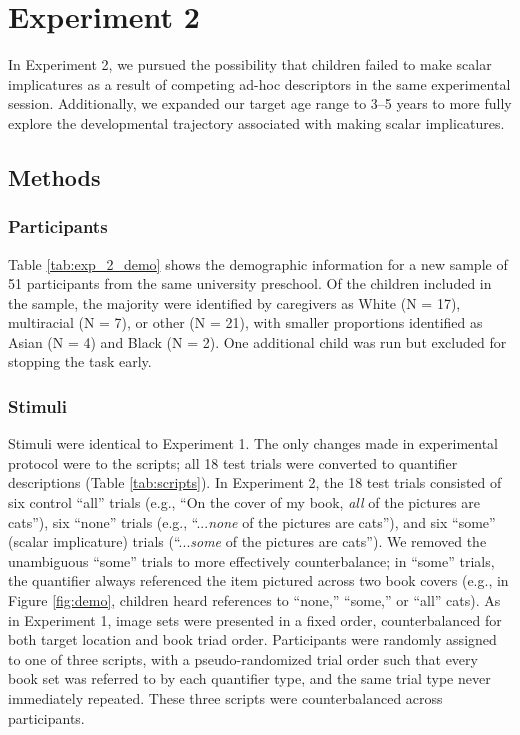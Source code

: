 \documentclass[man]{apa2}
\begin{document}
\section{Experiment 2}

In Experiment 2, we pursued the possibility that children failed to make scalar implicatures as a result of competing ad-hoc descriptors in the same experimental session. Additionally, we expanded our target age range to 3--5 years to more fully explore the developmental trajectory associated with making scalar implicatures.

\subsection{Methods}
\subsubsection{Participants}

Table \ref{tab:exp_2_demo} shows the demographic information for a new sample of 51 participants from the same university preschool. Of the children included in the sample, the majority were identified by caregivers as White (N = 17), multiracial (N = 7), or other (N = 21), with smaller proportions identified as Asian (N = 4) and Black (N = 2). One additional child was run but excluded for stopping the task early.
\subsubsection{Stimuli}

Stimuli were identical to Experiment 1. The only changes made in experimental protocol were to the scripts;  all 18 test trials were converted to quantifier descriptions (Table \ref{tab:scripts}). In Experiment 2, the 18 test trials consisted of six control ``all'' trials (e.g., ``On the cover of my book, \textit{all} of the pictures are cats''), six ``none'' trials (e.g., ``...\textit{none} of the pictures are cats''), and six ``some'' (scalar implicature) trials (``...\textit{some} of the pictures are cats''). We removed the unambiguous ``some'' trials to more effectively counterbalance; in ``some'' trials, the quantifier always referenced the item pictured across two book covers (e.g., in Figure \ref{fig:demo}, children heard references to ``none,'' ``some,'' or ``all'' cats). As in Experiment 1, image sets were presented in a fixed order, counterbalanced for both target location and book triad order. Participants were randomly assigned to one of three scripts, with a pseudo-randomized trial order such that every book set was referred to by each quantifier type, and the same trial type never immediately repeated. These three scripts were counterbalanced across participants.
\end{document}
